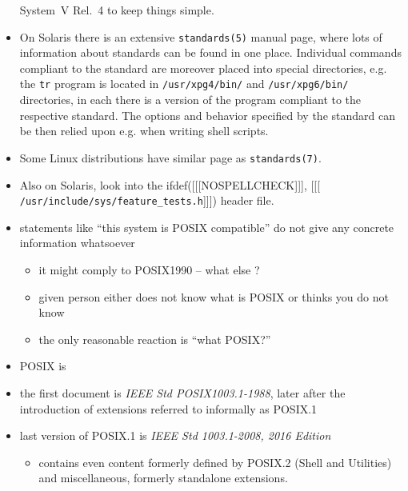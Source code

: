 \begin{itemize}
System~V Rel.~4 to keep things simple.
\item On Solaris there is an extensive \texttt{standards(5)} manual page, where
lots of information about standards can be found in one place.
Individual commands compliant to the standard are moreover placed
into special directories, e.g. the \texttt{tr} program is located in
\texttt{/usr/xpg4/bin/} and \texttt{/usr/xpg6/bin/} directories, in each there
is a version of the program compliant to the respective standard.
The options and behavior specified by the standard can be then relied upon e.g.
when writing shell scripts.
\item Some Linux distributions have similar page as \texttt{standards(7)}.
\item Also on Solaris, look into the
ifdef([[[NOSPELLCHECK]]], [[[
\texttt{/usr/inc{}lude/sys/fea\-ture\-\_tests.h}]]]) header file.
\end{itemize}



\begin{slide}
\begin{itemize}
\renewcommand{\baselinestretch}{0.8}
\item statements like ``this system is POSIX compatible'' do not give any
concrete information whatsoever
\begin{itemize}
\item it might comply to POSIX1990 -- what else ?
\item given person either does not know what is POSIX or thinks you do not know
\item the only reasonable reaction is ``what POSIX?''
\end{itemize}
\item POSIX is 
\item the first document is \emph{IEEE Std POSIX1003.1-1988}, later after the
introduction of extensions referred to informally as POSIX.1
\item last version of POSIX.1 is \emph{IEEE Std 1003.1-2008, 2016 Edition}
\begin{itemize}
\item contains even content formerly defined by POSIX.2 (Shell and Utilities)
and miscellaneous, formerly standalone extensions.
\end{itemize}
\end{itemize}
\end{slide}

